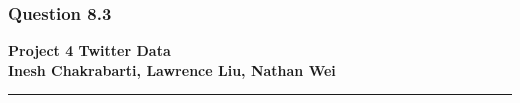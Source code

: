 \documentclass[11pt,letterpaper]{article}
\begin{document}
\subsubsection*{Question 8.3}
\pagebreak
\begin{center}
    \begin{minipage}{10cm}
    	\begin{center}
    	\textbf{\large Project 4 Twitter Data}\\[0.1cm]
        \textbf{Inesh Chakrabarti, Lawrence Liu, Nathan Wei}\\[0.1cm]
    	\end{center}
    \end{minipage}\hfill
\end{center}
\rule{17cm}{0.1mm}




\end{document}
